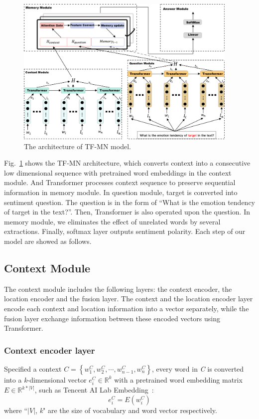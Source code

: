 \documentclass{ieeeaccess}
\begin{document}
\begin{figure}[htb]
	\centering
	\includegraphics[width=0.95\textwidth]{Transformer-mn.png}
	\caption{The architecture of TF-MN model.}\label{Transformer-mn}
\end{figure}

Fig.~\ref{Transformer-mn} shows the TF-MN architecture, which converts context into a consecutive low dimensional sequence with pretrained word embeddings in the context module. And Transformer processes context sequence to preserve sequential information in memory module. In question module, target is converted into sentiment question. The question is in the form of “What is the emotion tendency of target in the text?”. Then, Transformer is also operated upon the question. In memory module, we eliminates the effect of unrelated words by several extractions. Finally, softmax layer outputs sentiment polarity. Each step of our model are showed as follows.

\subsection{Context Module}
The context module includes the following layers: the context encoder, the location encoder and the fusion layer. The context and the location encoder layer encode each context and location information into a vector separately, while the fusion layer exchange information between these encoded vectors using Transformer.

\subsubsection{Context encoder layer}
Specified a context  $C = \left\{w_1^C, w_2^C, \cdots, w_{n-1}^C, w_n^C\right\}$, every word in \emph{C} is converted into a \emph{k}-dimensional vector $e_i^C \in \mathbb{R}^k$ with a pretrained word embedding matrix $E \in \mathbb{R}^{k\ast\left|V\right|}$, such as Tencent AI Lab Embedding~\cite{DBLP:conf/naacl/SongSLZ18}:
\begin{equation}e_i^C = E(w_i^C)\end{equation}
where “$\left|V\right|$, \emph{k}" are the size of vocabulary and word vector respectively.
\end{document}
